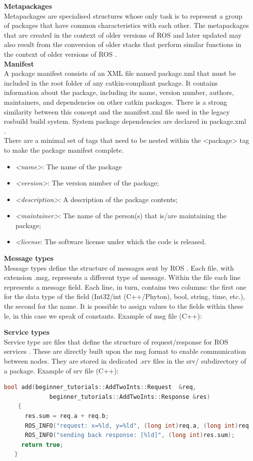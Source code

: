 \textbf{Metapackages}\\
Metapackages are specialised structures whose only task is to represent a group of packages that have common characteristics with each other. The metapackages that are created in the context of older versions of ROS and later updated may also result from the conversion of older stacks that perform similar functions in the context of older versions of ROS \citet{rosmetapackages}.\\
\newline
\textbf{Manifest}\\
A package manifest consists of an XML file named package.xml that must be included in the root folder of any catkin-compliant package. It contains information about the package, including its name, version number, authors, maintainers, and dependencies on other catkin packages. There is a strong similarity between this concept and the manifest.xml file used in the legacy rosbuild build system. System package dependencies are declared in package.xml \citet{rosmanifest}.\\
There are a minimal set of tags that need to be nested within the <package> tag to make the package manifest complete.
\begin{itemize}
    \item \textit{<name>}: The name of the package
    \item \textit{<version>}: The version number of the package;
    \item \textit{<description>}: A description of the package contents;
    \item \textit{<maintainer>}: The name of the person(s) that is/are maintaining the package;
    \item \textit{<license}: The software license under which the code is released.
\end{itemize}
\textbf{Message types}\\
Message types define the structure of messages sent by ROS \citet{rosmsg}. Each file, with extension .msg, represents a different type of message. Within the file each line represents a message field. Each line, in turn, contains two columns: the first one for the data type of the field
(Int32/int (C++/Phyton), bool, string, time, etc.), the second for the name. It is possible to assign values to the fields within these le, in this case we speak of constants. Example of msg file (C++):

\textbf{Service types}\\
Service type are files that define the structure of request/response for ROS services \citet{rossrv}.
These are directly built upon the msg format to enable communication between nodes. They are stored in dedicated .srv files in the srv/ subdirectory of a package.
Example of srv file (C++):
\begin{lstlisting}[language=C++]
 bool add(beginner_tutorials::AddTwoInts::Request  &req,
             beginner_tutorials::AddTwoInts::Response &res)
    {
      res.sum = req.a + req.b;
      ROS_INFO("request: x=%ld, y=%ld", (long int)req.a, (long int)req.b);
      ROS_INFO("sending back response: [%ld]", (long int)res.sum);
     return true;
   }
\end{lstlisting}


